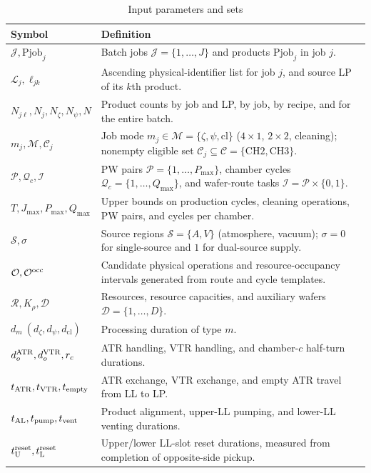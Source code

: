 \documentclass[final,5p,times,twocolumn]{elsarticle}
\begin{document}
\begin{table}[!t]
\centering\small
\caption{Input parameters and sets}
\label{tab:symbol-cn-a}
\renewcommand{\arraystretch}{1.03}
\setlength{\tabcolsep}{4pt}
\begin{tabular}{@{}C{0.20\textwidth}C{\textwidth-8pt\relax}@{}}
\toprule
Symbol & Definition\\\midrule
$\mathcal J,\mathrm{Pjob}_j$ & Batch jobs $\mathcal J=\{1,\ldots,J\}$ and products $\mathrm{Pjob}_j$ in job $j$.\\
$\mathcal L_j,\ell_{jk}$ & Ascending physical-identifier list for job $j$, and source LP of its $k$th product.\\
$N_{j\ell},N_j,N_\zeta,N_\psi,N$ & Product counts by job and LP, by job, by recipe, and for the entire batch.\\
$m_j,\mathcal M,\mathcal C_j$ & Job mode $m_j\in\mathcal M=\{\zeta,\psi,\mathrm{cl}\}$ ($4\times1$, $2\times2$, cleaning); nonempty eligible set $\mathcal C_j\subseteq\mathcal C=\{\mathrm{CH2},\mathrm{CH3}\}$.\\
$\mathcal P,\mathcal Q_c,\mathcal I$ & PW pairs $\mathcal P=\{1,\ldots,P_{\max}\}$, chamber cycles $\mathcal Q_c=\{1,\ldots,Q_{\max}\}$, and wafer-route tasks $\mathcal I=\mathcal P\times\{0,1\}$.\\
$T,J_{\max},P_{\max},Q_{\max}$ & Upper bounds on production cycles, cleaning operations, PW pairs, and cycles per chamber.\\
$\mathcal S,\sigma$ & Source regions $\mathcal S=\{A,V\}$ (atmosphere, vacuum); $\sigma=0$ for single-source and $1$ for dual-source supply.\\
$\mathcal O,\mathcal O^{\rm occ}$ & Candidate physical operations and resource-occupancy intervals generated from route and cycle templates.\\
$\mathcal R,K_\rho,\mathcal D$ & Resources, resource capacities, and auxiliary wafers $\mathcal D=\{1,\ldots,D\}$.\\
$d_m\ (d_\zeta,d_\psi,d_{\mathrm{cl}})$ & Processing duration of type $m$.\\
$d_o^{\rm ATR},d_o^{\rm VTR},r_c$ & ATR handling, VTR handling, and chamber-$c$ half-turn durations.\\
$t_{\rm ATR},t_{\rm VTR},t_{\rm empty}$ & ATR exchange, VTR exchange, and empty ATR travel from LL to LP.\\
$t_{\rm AL},t_{\rm pump},t_{\rm vent}$ & Product alignment, upper-LL pumping, and lower-LL venting durations.\\
$t_{\rm U}^{\rm reset},t_{\rm L}^{\rm reset}$ & Upper/lower LL-slot reset durations, measured from completion of opposite-side pickup.\\

\end{tabular}
\end{table}
\end{document}

